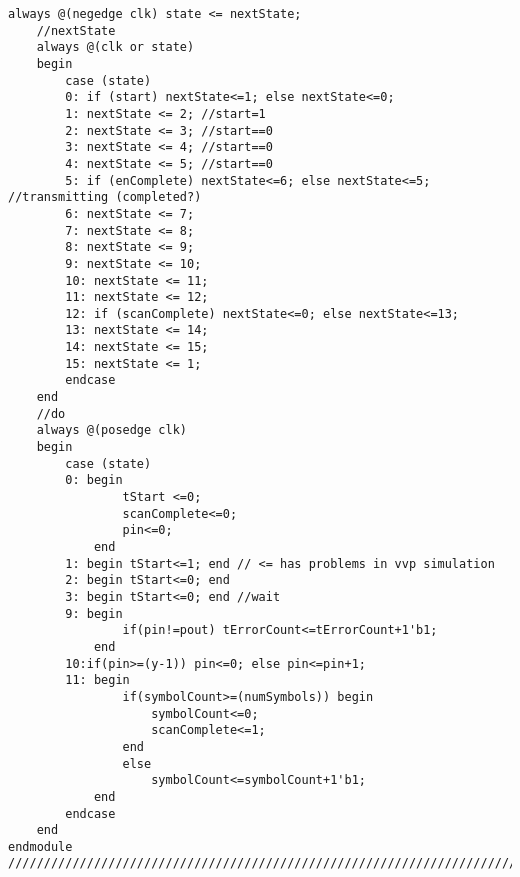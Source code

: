 \begin{lstlisting}[style=verilog-style,basicstyle=\tiny]
	always @(negedge clk) state <= nextState;
	//nextState
	always @(clk or state)
	begin
		case (state)
		0: if (start) nextState<=1; else nextState<=0;
		1: nextState <= 2; //start=1
		2: nextState <= 3; //start==0
		3: nextState <= 4; //start==0
		4: nextState <= 5; //start==0
		5: if (enComplete) nextState<=6; else nextState<=5; //transmitting (completed?)
		6: nextState <= 7;
		7: nextState <= 8;
		8: nextState <= 9;
		9: nextState <= 10;
		10: nextState <= 11;
		11: nextState <= 12;
		12: if (scanComplete) nextState<=0; else nextState<=13;
		13: nextState <= 14;
		14: nextState <= 15;
		15: nextState <= 1;
		endcase
	end
	//do
	always @(posedge clk)
	begin
		case (state)
		0: begin 
				tStart <=0;
				scanComplete<=0;
				pin<=0;
			end
		1: begin tStart<=1; end // <= has problems in vvp simulation
		2: begin tStart<=0; end
		3: begin tStart<=0; end //wait
		9: begin
				if(pin!=pout) tErrorCount<=tErrorCount+1'b1;
			end
		10:if(pin>=(y-1)) pin<=0; else pin<=pin+1; 
		11: begin
				if(symbolCount>=(numSymbols)) begin
					symbolCount<=0; 
					scanComplete<=1;
				end
				else
					symbolCount<=symbolCount+1'b1; 
			end
		endcase
	end
endmodule
//////////////////////////////////////////////////////////////////////////////////
\end{lstlisting}


\newpage
